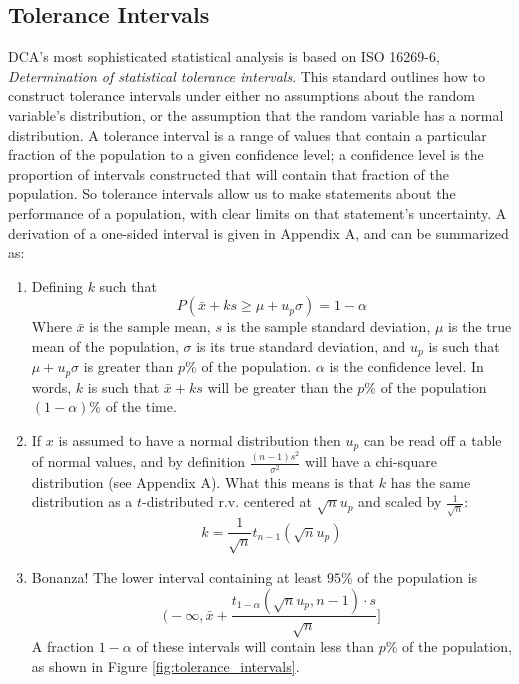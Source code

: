 \documentclass[11pt,a4paper,article]{memoir} %
\begin{document}
\subsection*{Tolerance Intervals}
DCA's most sophisticated statistical analysis is based on ISO 16269-6, \emph{Determination of statistical tolerance intervals}. This standard outlines how to construct tolerance intervals under either no assumptions about the random variable's distribution, or the assumption that the random variable has a normal distribution. A tolerance interval is a range of values that contain a particular fraction of the population to a given confidence level; a confidence level is the proportion of intervals constructed that will contain that fraction of the population. So tolerance intervals allow us to make statements about the performance of a population, with clear limits on that statement's uncertainty. A derivation of a one-sided interval is given in Appendix A, and can be summarized as:
\begin{enumerate}
	\item Defining $k$ such that
		\begin{equation}
			P(\bar{x} + ks \geq \mu + u_p \sigma) = 1 - \alpha
			\label{eq:tol_interval}
		\end{equation}
	Where $\bar{x}$ is the sample mean, $s$ is the sample standard deviation, $\mu$ is the true mean of the population, $\sigma$ is its true standard deviation, and $u_p$ is such that $\mu + u_p\sigma$ is greater than $p\%$ of the population. $\alpha$ is the confidence level. \newline In words, $k$ is such that $\bar{x} + ks$ will  be greater than the $p\%$ of the population $(1 - \alpha)\%$ of the time.
	\item If $x$ is assumed to have a normal distribution then $u_p$ can be read off a table of normal values, and by definition $\frac{(n-1)s^2}{\sigma^2}$ will have a chi-square distribution (see Appendix A). What this means is that $k$ has the same distribution as a $t$-distributed r.v. centered at $\sqrt{n}u_p$ and scaled by $\frac{1}{\sqrt{n}}$:
		\begin{equation}
			k = \frac{1}{\sqrt{n}}t_{n - 1}(\sqrt{n}u_p) 
		\end{equation}
	\item  Bonanza! The lower interval containing at least $95\%$  of the population is
\begin{equation}
	\Big(-\infty, \bar{x} + \frac{t_{1 - \alpha}(\sqrt{n}u_p, n - 1)\cdot s}{\sqrt{n}}\Big]
\end{equation}
A fraction $1 - \alpha$ of these intervals will contain less than $p\%$ of the population, as shown in Figure \ref{fig:tolerance_intervals}.
\end{enumerate}
\end{document}
